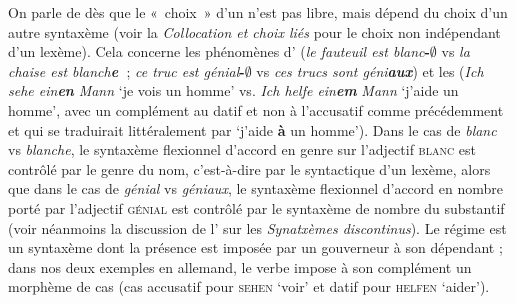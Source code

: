 {    On parle de  dès que le «~choix~» d’un  n’est pas libre, mais dépend du choix d’un autre syntaxème (voir la  \textit{Collocation et choix liés} pour le choix non indépendant d’un lexème). Cela concerne les phénomènes d’ (\textit{le fauteuil est blanc}\textbf{{}-}\textrm{\textbf{${\emptyset}$}} vs \textit{la chaise est blanch}\textbf{\textit{e~}}; \textit{ce truc est génial}\textbf{{}-}\textrm{\textbf{${\emptyset}$}} vs \textit{ces trucs sont géni}\textbf{\textit{aux}}) et les  (\textit{Ich sehe ein}\textbf{\textit{en}} \textit{Mann} ‘je vois un homme’ vs. \textit{Ich helfe ein}\textbf{\textit{em}} \textit{Mann} ‘j’aide un homme’, avec un complément au datif et non à l’accusatif comme précédemment et qui se traduirait littéralement par ‘j’aide \textbf{à} un homme’). Dans le cas de \textit{blanc} vs \textit{blanche}, le syntaxème flexionnel d’accord en genre sur l’adjectif \textsc{blanc} est contrôlé par le genre du nom, c’est-à-dire par le syntactique d’un lexème, alors que dans le cas de \textit{génial} vs \textit{géniaux}, le syntaxème flexionnel d’accord en nombre porté par l’adjectif \textsc{génial} est contrôlé par le syntaxème de nombre du substantif (voir néanmoins la discussion de l' sur les \textit{Synatxèmes discontinus}). Le régime est un syntaxème dont la présence est imposée par un gouverneur à son dépendant ; dans nos deux exemples en allemand, le verbe impose à son complément un morphème de cas (cas accusatif pour \textsc{sehen} ‘voir’ et datif pour \textsc{helfen} ‘aider’).

}
